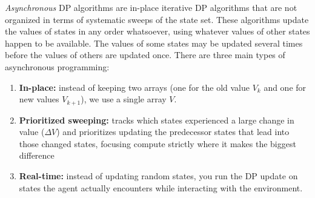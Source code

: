 \emph{Asynchronous} DP algorithms are in-place iterative DP algorithms that are not organized in terms of systematic sweeps of the state set. These algorithms update the values of states in any order whatsoever, using whatever values of other states happen to be available. The values of some states may be updated several times before the values of others are updated once. There are three main types of asynchronous programming:

\begin{enumerate}
    \item \textbf{In-place:} instead of keeping two arrays (one for the old value $V_k$ and one for new values $V_{k+1}$), we use a single array $V$.
    \item \textbf{Prioritized sweeping:} tracks which states experienced a large change in value ($\Delta V$) and prioritizes updating the predecessor states that lead into those changed states, focusing compute strictly where it makes the biggest difference
    \item \textbf{Real-time:} instead of updating random states, you run the DP update on states the agent actually encounters while interacting with the environment.
\end{enumerate}